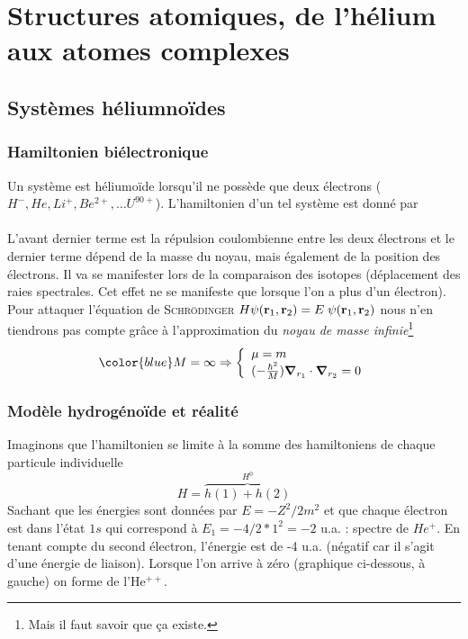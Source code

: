 \chapter{Structures atomiques, de l'hélium aux atomes complexes}
\section{Systèmes héliumnoïdes}
\subsection{Hamiltonien biélectronique}
Un système est héliumoïde lorsqu'il ne possède que deux électrons ($H^-, He, Li^+, Be^{2+},\dots 
U^{90+}$). L'hamiltonien d'un tel système est donné par\\

\ \\

L'avant dernier terme est la répulsion coulombienne entre les deux électrons et le dernier terme dépend
de la masse du noyau, mais également de la position des électrons. Il va se manifester lors de la
comparaison des isotopes (déplacement des raies spectrales. Cet effet ne se manifeste que lorsque l'on
a plus d'un électron). Pour attaquer l'équation de \textsc{Schrödinger} $H \psi ( {\bf r}_1, {\bf r}
_2 ) = E \; \psi ( {\bf r}_1, {\bf r}_2 )$ nous n'en tiendrons pas compte grâce à l'approximation du
\textit{noyau de masse infinie}\footnote{Mais il faut savoir que ça existe.}
\begin{equation}
{\color{blue} M = \infty} \Rightarrow \left\{
\begin{array}{l}
\mu = m \\
(- \frac{\hbar^2}{M}) \mbox{\boldmath $ \nabla $}_{r_1}
\cdot \mbox{\boldmath $ \nabla $}_{r_2} = 0
\end{array}
\right.
\end{equation}

\subsection{Modèle hydrogénoïde et réalité}
Imaginons que l'hamiltonien se limite à la somme des hamiltoniens de chaque particule individuelle
\begin{equation}
H = \overbrace{h(1) + h(2)}^{H^0}
\end{equation}
Sachant que les énergies sont données par $E=-Z^2/2m^2$ et que chaque électron est dans l'état $1s$
qui correspond à $E_1=-4/2*1^2=-2$ u.a. : spectre de $He^+$. En tenant compte du second électron, 
l'énergie est de -4 u.a. (négatif car il s'agit d'une énergie de liaison). Lorsque l'on arrive à
zéro (graphique ci-dessous, à gauche) on forme de l'He$^{++}$.\\

